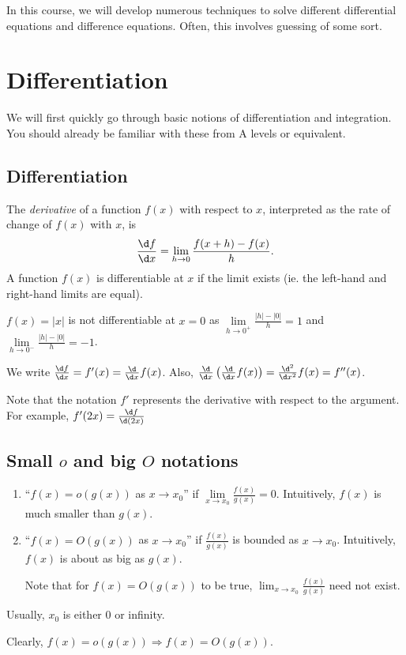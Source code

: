 \documentclass[a4paper]{article}
\begin{document}
In this course, we will develop numerous techniques to solve different differential equations and difference equations. Often, this involves guessing of some sort.

\section{Differentiation}
We will first quickly go through basic notions of differentiation and integration. You should already be familiar with these from A levels or equivalent.

\subsection{Differentiation}
\begin{defi}
  The \emph{derivative} of a function $f(x)$ with respect to $x$, interpreted as the rate of change of $f(x)$ with $x$, is
  \[
    \frac{\d f}{\d x} = \lim_{h\to 0} \frac{f(x + h) - f(x)}{h}.
  \]
  A function $f(x)$ is differentiable at $x$ if the limit exists (ie. the left-hand and right-hand limits are equal).
\end{defi}

\begin{eg}
  $f(x)=|x|$ is not differentiable at $x = 0$ as $\lim\limits_{h\to 0^+} \frac{|h| - |0|}{h}= 1$ and $\lim\limits_{h\to 0^-} \frac{|h| - |0|}{h}= -1$.
\end{eg}

\begin{notation}
  We write $\frac{\d f}{\d x} = f'(x) = \frac{\d}{\d x} f(x)$. Also, $\frac{\d}{\d x}\left(\frac{\d}{\d x} f(x)\right) = \frac{\d^2}{\d x^2} f(x) = f''(x)$.

  Note that the notation $f'$ represents the derivative with respect to the argument. For example, $f'(2x) = \frac{\d f}{\d (2x)}$
\end{notation}

\subsection{Small \texorpdfstring{$o$}{o} and big \texorpdfstring{$O$}{O} notations}
\begin{defi}\leavevmode
  \begin{enumerate}
    \item ``$f(x) = o(g(x))$ as $x\to x_0$'' if $\lim\limits_{x\to x_0} \frac{f(x)}{g(x)} = 0$. Intuitively, $f(x)$ is much smaller than $g(x)$.
    \item ``$f(x) = O(g(x))$ as $x\to x_0$'' if $\frac{f(x)}{g(x)}$ is bounded as $x\to x_0$. Intuitively, $f(x)$ is about as big as $g(x)$.

      Note that for $f(x) = O(g(x))$ to be true, $\displaystyle \lim_{x\to x_0} \frac{f(x)}{g(x)}$ need not exist.
  \end{enumerate}
  Usually, $x_0$ is either $0$ or infinity.
\end{defi}
Clearly, $f(x)=o(g(x))\Rightarrow f(x) = O(g(x))$.
\end{document}
